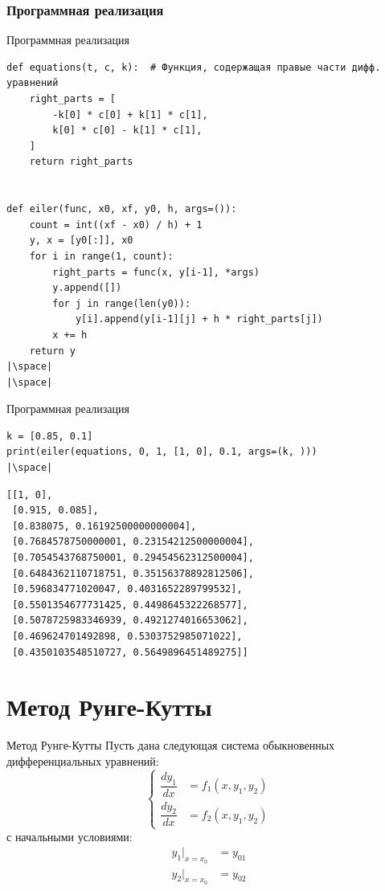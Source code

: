 \documentclass[aspectratio=169, mathserif]{beamer}	%
\begin{document}
\subsubsection{Программная реализация}
\begin{frame}[fragile]{Программная реализация}
\scriptsize
\begin{verbatim}
def equations(t, c, k):  # Функция, содержащая правые части дифф. уравнений
    right_parts = [
        -k[0] * c[0] + k[1] * c[1],
        k[0] * c[0] - k[1] * c[1],
    ]
    return right_parts


def eiler(func, x0, xf, y0, h, args=()):
    count = int((xf - x0) / h) + 1
    y, x = [y0[:]], x0
    for i in range(1, count):
        right_parts = func(x, y[i-1], *args)
        y.append([])
        for j in range(len(y0)):
            y[i].append(y[i-1][j] + h * right_parts[j])
        x += h
    return y
|\space|
|\space|
\end{verbatim}
\vfill
\end{frame}


\begin{frame}[fragile, ]{Программная реализация}
\scriptsize
\begin{verbatim}
k = [0.85, 0.1]
print(eiler(equations, 0, 1, [1, 0], 0.1, args=(k, )))
|\space|
\end{verbatim}
\vfill
\begin{verbatim}
[[1, 0],
 [0.915, 0.085],
 [0.838075, 0.16192500000000004],
 [0.7684578750000001, 0.23154212500000004],
 [0.7054543768750001, 0.29454562312500004],
 [0.6484362110718751, 0.35156378892812506],
 [0.596834771020047, 0.4031652289799532],
 [0.5501354677731425, 0.4498645322268577],
 [0.5078725983346939, 0.4921274016653062],
 [0.469624701492898, 0.5303752985071022],
 [0.4350103548510727, 0.5649896451489275]]
\end{verbatim}
\vfill
\end{frame}


\section{Метод Рунге-Кутты}
\sectionframe


\begin{frame}[fragile, ]{Метод Рунге-Кутты}
\scriptsize
Пусть дана следующая система обыкновенных дифференциальных уравнений:
\vfill
\begin{equation}
	\left\{
	\begin{aligned}
		\dfrac{dy_1}{dx} &= f_1 \left(x, y_1, y_2\right) \\
		\dfrac{dy_2}{dx} &= f_2\left(x, y_1, y_2\right)
	\end{aligned}
	\right.
\end{equation}
\vfill
\noindent с начальными условиями:
\vfill
\begin{equation}
	\begin{aligned}
		y_1 \big |_{x=x_0} &= y_{01} \\
		y_2 \big |_{x=x_0} &= y_{02}
	\end{aligned}
\end{equation}
\vfill
\end{frame}
\end{document}
